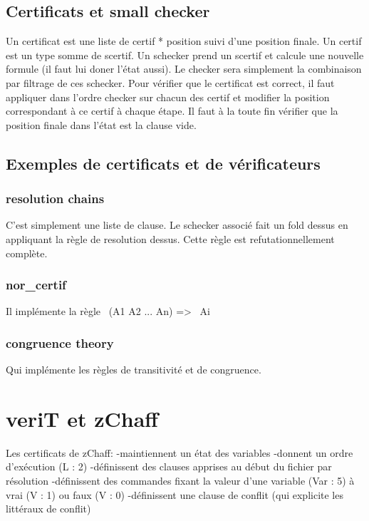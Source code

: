 \subsection{Certificats et small checker}
Un certificat est une liste de certif * position suivi d'une position finale.
Un certif est un type somme de scertif.
Un schecker prend un scertif et calcule une nouvelle formule (il faut lui doner l'état aussi).
Le checker sera simplement la combinaison par filtrage de ces schecker.
Pour vérifier que le certificat est correct, il faut appliquer dans l'ordre checker sur
chacun des certif et modifier la position correspondant à ce certif à chaque étape.
Il faut à la toute fin vérifier que la position finale dans l'état est la clause vide.

\subsection{Exemples de certificats et de vérificateurs}
\subsubsection{resolution chains}
C'est simplement une liste de clause.
Le schecker associé fait un fold dessus en appliquant la règle de resolution dessus. Cette règle est
refutationnellement complète.

\subsubsection{nor\_certif}
Il implémente la règle ~(A1 \/ A2 \/ ... \/ An) => ~Ai

\subsubsection{congruence theory}
Qui implémente les règles de transitivité et de congruence.



\section{veriT et zChaff}
Les certificats de zChaff:
-maintiennent un état des variables
-donnent un ordre d'exécution (L : 2)
-définissent des clauses apprises au début du fichier par résolution
-définissent des commandes fixant la valeur d'une variable (Var : 5) à vrai (V : 1) ou faux (V : 0)
-définissent une clause de conflit (qui explicite les littéraux de conflit)

